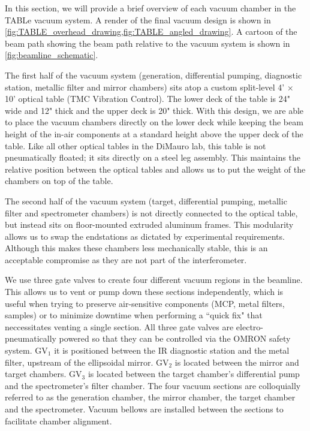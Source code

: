 In this section, we will provide a brief overview of each vacuum chamber in the TABLe vacuum system. A render of the final vacuum design is shown in \cref{fig:TABLE_overhead_drawing,fig:TABLE_angled_drawing}. A cartoon of the beam path showing the beam path relative to the vacuum system is shown in \cref{fig:beamline_schematic}.

The first half of the vacuum system (generation, differential pumping, diagnostic station,  metallic filter and mirror chambers) sits atop a custom split-level 4' $\times$ 10' optical table (TMC Vibration Control). The lower deck of the table is 24" wide and 12" thick and the upper deck is 20" thick. With this design, we are able to place the vacuum chambers directly on the lower deck while keeping the beam height of the in-air components at a standard height above the upper deck of the table. Like all other optical tables in the DiMauro lab, this table is not pneumatically floated; it sits directly on a steel leg assembly. This maintains the relative position between the optical tables and allows us to put the weight of the chambers on top of the table.

The second half of the vacuum system (target, differential pumping,  metallic filter and spectrometer chambers) is not directly connected to the optical table, but instead sits on floor-mounted extruded aluminum frames. This modularity allows us to swap the endstations as dictated by experimental requirements. Although this makes these chambers less mechanically stable, this is an acceptable compromise as they are not part of the interferometer.

We use three gate valves to create four different vacuum regions in the beamline. This allows us to vent or pump down these sections independently, which is useful when trying to preserve air-sensitive components (MCP, metal filters, samples) or to minimize downtime when performing a ``quick fix" that neccessitates venting a single section. All three gate valves are electro-pneumatically powered so that they can be controlled via the OMRON safety system. GV$_1$ it is positioned between the IR diagnostic station and the metal filter, upstream of the ellipsoidal mirror. GV$_2$ is located between the mirror and target chambers. GV$_3$ is located between the target chamber's differential pump and the spectrometer's filter chamber. The four vacuum sections are colloquially referred to as the generation chamber, the mirror chamber, the target chamber and the spectrometer. Vacuum bellows are installed between the sections to facilitate chamber alignment.

